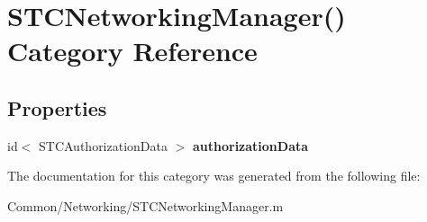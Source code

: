 \hypertarget{category_s_t_c_networking_manager_07_08}{}\section{S\+T\+C\+Networking\+Manager() Category Reference}
\label{category_s_t_c_networking_manager_07_08}
\subsection*{Properties}
\begin{DoxyCompactItemize}
\item 
\hypertarget{category_s_t_c_networking_manager_07_08_a477b7c505352b4ac5f9dece98a84f3b8}{}\label{category_s_t_c_networking_manager_07_08_a477b7c505352b4ac5f9dece98a84f3b8} 
id$<$ S\+T\+C\+Authorization\+Data $>$ {\bfseries authorization\+Data}
\end{DoxyCompactItemize}


The documentation for this category was generated from the following file\+:\begin{DoxyCompactItemize}
\item 
Common/\+Networking/S\+T\+C\+Networking\+Manager.\+m\end{DoxyCompactItemize}
